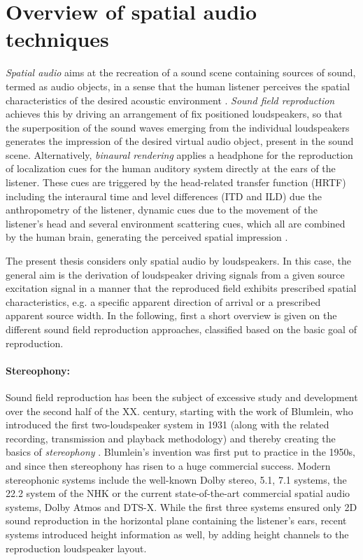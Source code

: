 \section{Overview of spatial audio techniques}
\emph{Spatial audio} aims at the recreation of a sound scene containing sources of sound, termed as audio objects, in a sense that the human listener perceives the spatial characteristics of the desired acoustic environment \cite{Zhang2017}.
\emph{Sound field reproduction} achieves this by driving an arrangement of fix positioned loudspeakers, so that the superposition of the sound waves emerging from the individual loudspeakers generates the impression of the desired virtual audio object, present in the sound scene.
Alternatively, \emph{binaural rendering} applies a headphone for the reproduction of localization cues for the human auditory system directly at the ears of the listener.
These cues are triggered by the head-related transfer function (HRTF) including the interaural time and level differences (ITD and ILD) due the anthropometry of the listener, dynamic cues due to the movement of the listener's head and several environment scattering cues, which all are combined by the human brain, generating the perceived spatial impression \cite{Blauert1983}.

The present thesis considers only spatial audio by loudspeakers.
In this case, the general aim is the derivation of loudspeaker driving signals from a given source excitation signal in a manner that the reproduced field exhibits prescribed spatial characteristics, e.g. a specific apparent direction of arrival or a prescribed apparent source width.
In the following, first a short overview is given on the different sound field reproduction approaches, classified based on the basic goal of reproduction.

\paragraph{Stereophony:}
Sound field reproduction has been the subject of excessive study and development over the second half of the XX. century, starting with the work of Blumlein, who introduced the first two-loudspeaker system in 1931 (along with the related recording, transmission and playback methodology) and thereby creating the basics of \emph{stereophony} \cite{Blumlein1932, Alexander2000}.
Blumlein's invention was first put to practice in the 1950s, and since then stereophony has risen to a huge commercial success.
Modern stereophonic systems include the well-known Dolby stereo, 5.1, 7.1 systems, the 22.2 system of the NHK \cite{hamasaki2005the, hamasaki2011the} or the current state-of-the-art commercial spatial audio systems, Dolby Atmos \cite{Atmos} and DTS-X.
While the first three systems ensured only 2D sound reproduction in the horizontal plane containing the listener's ears, recent systems introduced height information as well, by adding height channels to the reproduction loudspeaker layout.

